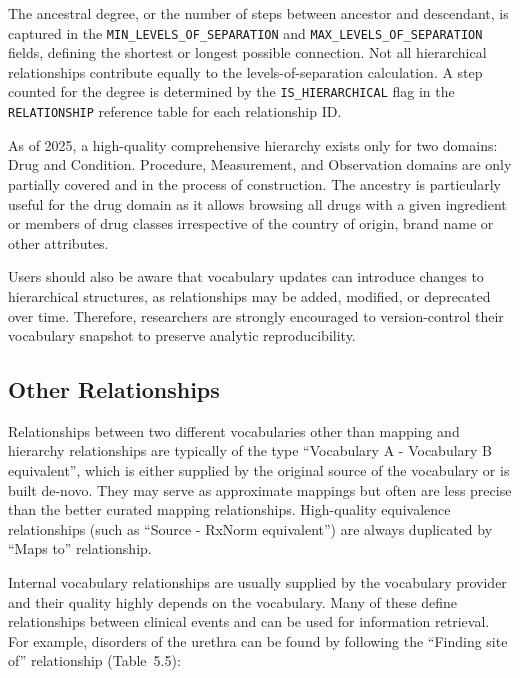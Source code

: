 \documentclass[
  letterpaper,
  paper=7in:10in,
  pagesize=pdftex,
  headinclude=on,
  footinclude=on,
  12pt]{scrbook}
\begin{document}
The ancestral degree, or the number of steps between ancestor and
descendant, is captured in the \texttt{MIN\_LEVELS\_OF\_SEPARATION} and
\texttt{MAX\_LEVELS\_OF\_SEPARATION} fields, defining the shortest or
longest possible connection. Not all hierarchical relationships
contribute equally to the levels-of-separation calculation. A step
counted for the degree is determined by the \texttt{IS\_HIERARCHICAL}
flag in the \texttt{RELATIONSHIP} reference table for each relationship
ID.

As of 2025, a high-quality comprehensive hierarchy exists only for two
domains: Drug and Condition. Procedure, Measurement, and Observation
domains are only partially covered and in the process of construction.
The ancestry is particularly useful for the drug domain as it allows
browsing all drugs with a given ingredient or members of drug classes
irrespective of the country of origin, brand name or other attributes.

Users should also be aware that vocabulary updates can introduce changes
to hierarchical structures, as relationships may be added, modified, or
deprecated over time. Therefore, researchers are strongly encouraged to
version-control their vocabulary snapshot to preserve analytic
reproducibility.

\subsection{Other Relationships}\label{other-relationships}

Relationships between two different vocabularies other than mapping and
hierarchy relationships are typically of the type ``Vocabulary A -
Vocabulary B equivalent'', which is either supplied by the original
source of the vocabulary or is built de-novo. They may serve as
approximate mappings but often are less precise than the better curated
mapping relationships. High-quality equivalence relationships (such as
``Source - RxNorm equivalent'') are always duplicated by ``Maps to''
relationship.

Internal vocabulary relationships are usually supplied by the vocabulary
provider and their quality highly depends on the vocabulary. Many of
these define relationships between clinical events and can be used for
information retrieval. For example, disorders of the urethra can be
found by following the ``Finding site of'' relationship (Table~5.5):
\end{document}

